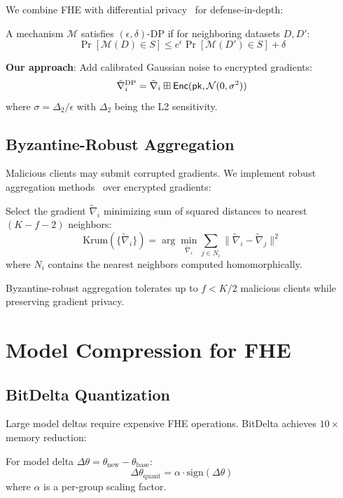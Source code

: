 \documentclass{../shared/luxfhe}
\begin{document}
We combine FHE with differential privacy~\cite{dwork-dp} for defense-in-depth:

\begin{definition}
A mechanism $\mathcal{M}$ satisfies $(\epsilon, \delta)$-DP if for neighboring datasets $D, D'$:
\[
\Pr[\mathcal{M}(D) \in S] \leq e^\epsilon \Pr[\mathcal{M}(D') \in S] + \delta
\]
\end{definition}

\textbf{Our approach}: Add calibrated Gaussian noise to encrypted gradients:
\[
\tilde{\nabla}_i^{\text{DP}} = \tilde{\nabla}_i \boxplus \mathsf{Enc}(\mathsf{pk}, \mathcal{N}(0, \sigma^2))
\]
where $\sigma = \Delta_2 / \epsilon$ with $\Delta_2$ being the L2 sensitivity.

\subsection{Byzantine-Robust Aggregation}

Malicious clients may submit corrupted gradients. We implement robust aggregation methods~\cite{krum} over encrypted gradients:

\begin{definition}
Select the gradient $\tilde{\nabla}_i$ minimizing sum of squared distances to nearest $(K-f-2)$ neighbors:
\[
\text{Krum}(\{\tilde{\nabla}_i\}) = \arg\min_{\tilde{\nabla}_i} \sum_{j \in N_i} \|\tilde{\nabla}_i - \tilde{\nabla}_j\|^2
\]
where $N_i$ contains the nearest neighbors computed homomorphically.
\end{definition}

Byzantine-robust aggregation tolerates up to $f < K/2$ malicious clients while preserving gradient privacy.

\section{Model Compression for FHE}

\subsection{BitDelta Quantization}

Large model deltas require expensive FHE operations. BitDelta achieves $10\times$ memory reduction:

\begin{definition}
For model delta $\Delta\theta = \theta_{\text{new}} - \theta_{\text{base}}$:
\[
\Delta\theta_{\text{quant}} = \alpha \cdot \text{sign}(\Delta\theta)
\]
where $\alpha$ is a per-group scaling factor.
\end{definition}
\end{document}
